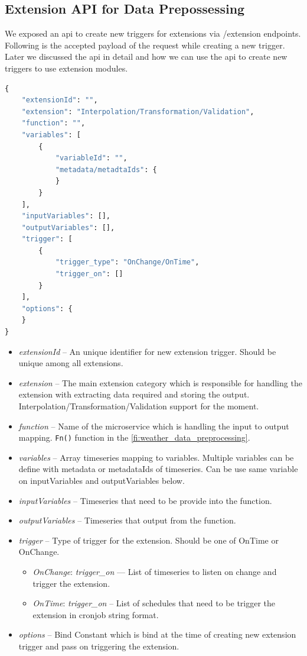 \subsection{Extension API for Data Prepossessing}

We exposed an \acrshort{api} to create new triggers for extensions via /extension endpoints. Following is the accepted payload of the request while creating a new trigger. Later we discussed the \acrshort{api} in detail and how we can use the \acrshort{api} to create new triggers to use extension modules.

\begin{lstlisting}[language=Python]
{
    "extensionId": "",
    "extension": "Interpolation/Transformation/Validation",
    "function": "",
    "variables": [
        {
            "variableId": "",
            "metadata/metadtaIds": {
            }
        }
    ],
    "inputVariables": [],
    "outputVariables": [],
    "trigger": [
        {
            "trigger_type": "OnChange/OnTime",
            "trigger_on": []
        }
    ],
    "options": {
    }
}
\end{lstlisting}
\begin{itemize}
    \item \emph{extensionId} -- An unique identifier for new extension trigger. Should be unique among all extensions.
    \item \emph{extension} -- The main extension category which is responsible for handling the extension with extracting data required and storing the output. Interpolation/Transformation/Validation support for the moment.
    \item \emph{function} -- Name of the microservice which is handling the input to output mapping. \texttt{Fn()} function in the \cref{fi:weather_data_preprocessing}.
    \item \emph{variables} -- Array timeseries mapping to variables. Multiple variables can be define with metadata or metadataIds of timeseries. Can be use same variable on inputVariables and outputVariables below.
    \item \emph{inputVariables} -- Timeseries that need to be provide into the function.
    \item \emph{outputVariables} -- Timeseries that output from the function.
    \item \emph{trigger} -- Type of trigger for the extension. Should be one of OnTime or OnChange.
        \begin{itemize}
            \item \emph{OnChange}: \textit{trigger\_on} --- List of timeseries to listen on change and trigger the extension.
            \item \emph{OnTime}: \textit{trigger\_on} -- List of schedules that need to be trigger the extension in cronjob string format.
        \end{itemize}
    \item \emph{options} -- Bind Constant which is bind at the time of creating new extension trigger and pass on triggering the extension.
\end{itemize}

